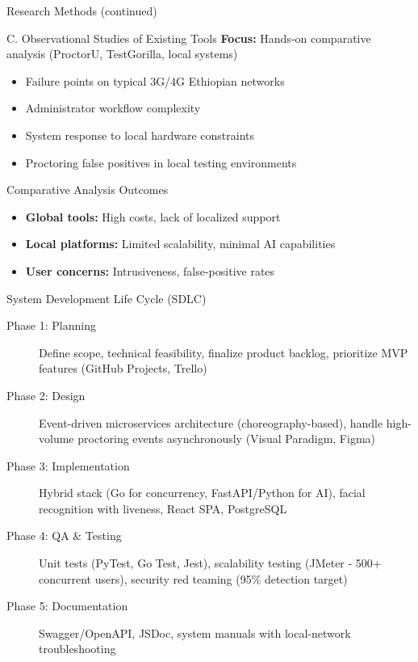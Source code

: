 \begin{frame}{Research Methods (continued)}
    \begin{block}{C. Observational Studies of Existing Tools}
        \textbf{Focus:} Hands-on comparative analysis (ProctorU, TestGorilla, local systems)
        \begin{itemize}
            \item Failure points on typical 3G/4G Ethiopian networks
            \item Administrator workflow complexity
            \item System response to local hardware constraints
            \item Proctoring false positives in local testing environments
        \end{itemize}
    \end{block}
    
    \begin{block}{Comparative Analysis Outcomes}
        \begin{itemize}
            \item \textbf{Global tools:} High costs, lack of localized support
            \item \textbf{Local platforms:} Limited scalability, minimal AI capabilities
            \item \textbf{User concerns:} Intrusiveness, false-positive rates
        \end{itemize}
    \end{block}
\end{frame}

\begin{frame}{System Development Life Cycle (SDLC)}
    \begin{description}
        \item[Phase 1: Planning] Define scope, technical feasibility, finalize product backlog, prioritize MVP features (GitHub Projects, Trello)
        
        \item[Phase 2: Design] Event-driven microservices architecture (choreography-based), handle high-volume proctoring events asynchronously (Visual Paradigm, Figma)
        
        \item[Phase 3: Implementation] Hybrid stack (Go for concurrency, FastAPI/Python for AI), facial recognition with liveness, React SPA, PostgreSQL
        
        \item[Phase 4: QA \& Testing] Unit tests (PyTest, Go Test, Jest), scalability testing (JMeter - 500+ concurrent users), security red teaming (95\% detection target)
        
        \item[Phase 5: Documentation] Swagger/OpenAPI, JSDoc, system manuals with local-network troubleshooting
    \end{description}
\end{frame}

